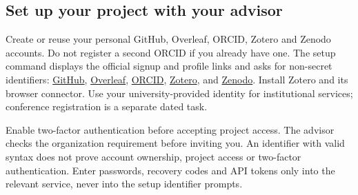 \subsection{Set up your project with your advisor}
\label{guide:setup:terminal}

Create or reuse your personal GitHub, Overleaf, ORCID, Zotero and Zenodo accounts.
Do not register a second ORCID if you already have one. The setup command displays
the official signup and profile links and asks for non-secret identifiers:
\href{https://github.com/signup}{GitHub},
\href{https://www.overleaf.com/register}{Overleaf},
\href{https://orcid.org/register}{ORCID},
\href{https://www.zotero.org/user/register}{Zotero}, and
\href{https://zenodo.org/signup/}{Zenodo}.
Install Zotero and its browser connector. Use your university-provided identity
for institutional services; conference registration is a separate dated task.

Enable two-factor authentication before accepting project access. The advisor checks the organization requirement before inviting you. An identifier with valid syntax
does not prove account ownership, project access or two-factor authentication.
Enter passwords, recovery codes and API tokens only into the relevant service,
never into the setup identifier prompts.


